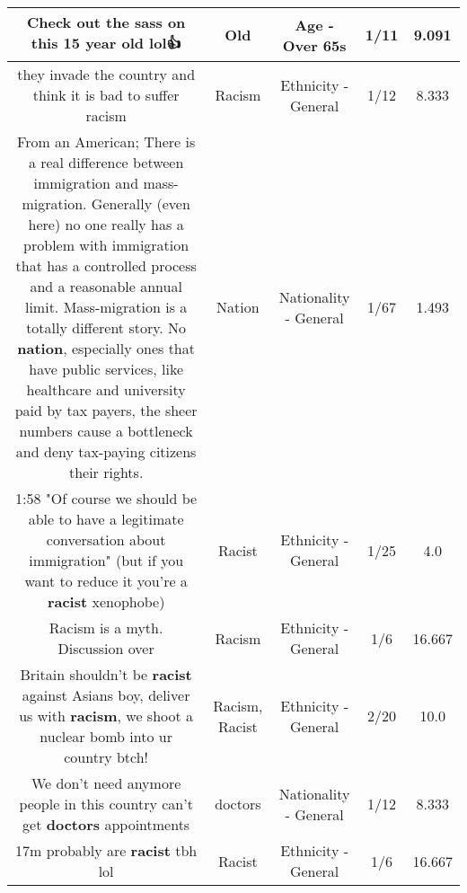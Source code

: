 \documentclass[11pt]{article}
\newlength\mylength
\begin{document}
\begin{center}
\begin{longtable}{|C{.65\mylength}|C{.30\mylength}|C{.12\mylength}|C{.12\mylength}|C{.12\mylength}|}
  \small Check out the sass on this 15 year \textbf{old} lol👍\normalsize   & Old & Age - Over 65s & 1/11 & 9.091 \\  \hline
  \small they invade the country and think it is bad to suffer racism\normalsize   & Racism & Ethnicity - General & 1/12 & 8.333 \\  \hline
  \small From an American; There is a real difference between immigration and mass-migration. Generally (even here) no one really has a problem with immigration that has a controlled process and a reasonable annual limit. Mass-migration is a totally different story. No \textbf{nation}, especially ones that have public services, like healthcare and university paid by tax payers, the sheer numbers cause a bottleneck and deny tax-paying citizens their rights.\normalsize   & Nation & Nationality - General & 1/67 & 1.493 \\  \hline
  \small 1:58 "Of course we should be able to have a legitimate conversation about immigration" (but if you want to reduce it you're a \textbf{racist} xenophobe)\normalsize   & Racist & Ethnicity - General & 1/25 & 4.0 \\  \hline
  \small Racism is a myth. Discussion over\normalsize   & Racism & Ethnicity - General & 1/6 & 16.667 \\  \hline
  \small Britain shouldn't be \textbf{racist} against Asians boy, deliver us with \textbf{racism}, we shoot a nuclear bomb into ur country btch!\normalsize   & Racism, Racist & Ethnicity - General & 2/20 & 10.0 \\  \hline
  \small We don't need anymore people in this country can't get \textbf{doctors} appointments\normalsize   & doctors & Nationality - General & 1/12 & 8.333 \\  \hline
  \small 17m probably are \textbf{racist} tbh lol\normalsize   & Racist & Ethnicity - General & 1/6 & 16.667 \\  \hline

\end{longtable}
\end{center}
\end{document}
